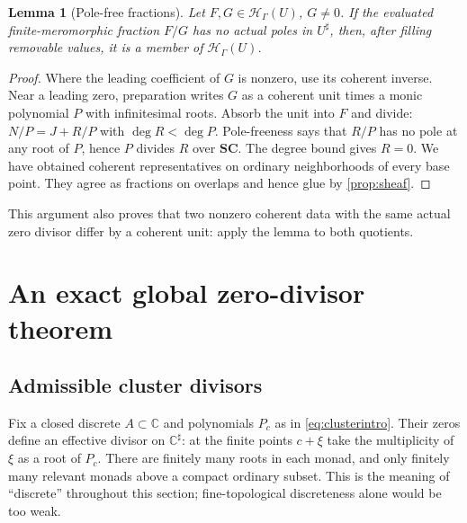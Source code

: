\documentclass[11pt,letterpaper]{article}
\newtheorem{lemma}[theorem]{Lemma}
\theoremstyle{definition}
\theoremstyle{remark}
\newcommand{\C}{\mathbb C}
\newcommand{\SC}{\mathbf{SC}}
\newcommand{\HH}{\mathscr H_\Gamma}
\newcommand{\sh}{^{\sharp}}
\numberwithin{equation}{section}
\begin{document}
\begin{lemma}[Pole-free fractions]\label{lem:polefree}
Let $F,G\in\HH(U)$, $G\ne0$. If the evaluated finite-meromorphic fraction $F/G$ has no actual poles in $U\sh$, then, after filling removable values, it is a member of $\HH(U)$.
\end{lemma}
\begin{proof}
Where the leading coefficient of $G$ is nonzero, use its coherent inverse. Near a leading zero, preparation writes $G$ as a coherent unit times a monic polynomial $P$ with infinitesimal roots. Absorb the unit into $F$ and divide: $N/P=J+R/P$ with $\deg R<\deg P$. Pole-freeness says that $R/P$ has no pole at any root of $P$, hence $P$ divides $R$ over $\SC$. The degree bound gives $R=0$. We have obtained coherent representatives on ordinary neighborhoods of every base point. They agree as fractions on overlaps and hence glue by \cref{prop:sheaf}.
\end{proof}
This argument also proves that two nonzero coherent data with the same actual zero divisor differ by a coherent unit: apply the lemma to both quotients.

\section{An exact global zero-divisor theorem}\label{sec:divisors}

\subsection{Admissible cluster divisors}
Fix a closed discrete $A\subset\C$ and polynomials $P_c$ as in \eqref{eq:clusterintro}. Their zeros define an effective divisor on $\C\sh$: at the finite points $c+\xi$ take the multiplicity of $\xi$ as a root of $P_c$. There are finitely many roots in each monad, and only finitely many relevant monads above a compact ordinary subset. This is the meaning of ``discrete'' throughout this section; fine-topological discreteness alone would be too weak.
\end{document}
